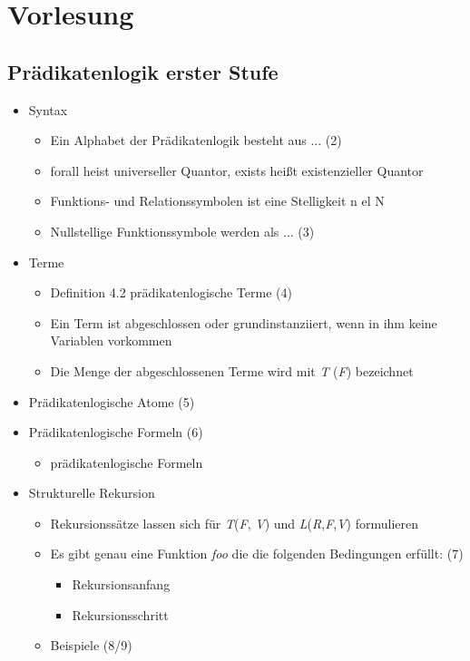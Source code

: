 
\chapter{Vorlesung \cite[S. 22]{Hoelldobler2011}}
\section{Prädikatenlogik erster Stufe}
\begin{itemize}
\item Syntax
\begin{itemize}
	\item Ein Alphabet der Prädikatenlogik besteht aus ... (2)
	\item forall heist universeller Quantor, exists heißt							existenzieller Quantor
	\item Funktions- und Relationssymbolen ist eine Stelligkeit n el N			\item Nullstellige Funktionssymbole werden als ... (3)
\end{itemize}
\item Terme
\begin{itemize}
	\item Definition 4.2 prädikatenlogische Terme (4)
	\item Ein Term ist abgeschlossen oder grundinstanziiert, wenn in ihm 			keine Variablen vorkommen
	\item Die Menge der abgeschlossenen Terme wird mit \textit{T}						(\textit{F}) bezeichnet
\end{itemize}
\item Prädikatenlogische Atome (5)
\item Prädikatenlogische Formeln (6)
\begin{itemize}
	\item prädikatenlogische Formeln
\end{itemize}
\item Strukturelle Rekursion 
\begin{itemize}
	\item Rekursionssätze lassen sich für \textit{T}(\textit{F},					\textit{V}) und \textit{L}(\textit{R},\textit{F},\textit{V}) 				formulieren 
	\item Es gibt genau eine Funktion \textit{foo} die die folgenden Bedingungen 				erfüllt: (7)
	\begin{itemize}
		\item Rekursionsanfang
		\item Rekursionsschritt
	\end{itemize}
	\item Beispiele (8/9)
\end{itemize}
\end{itemize}

